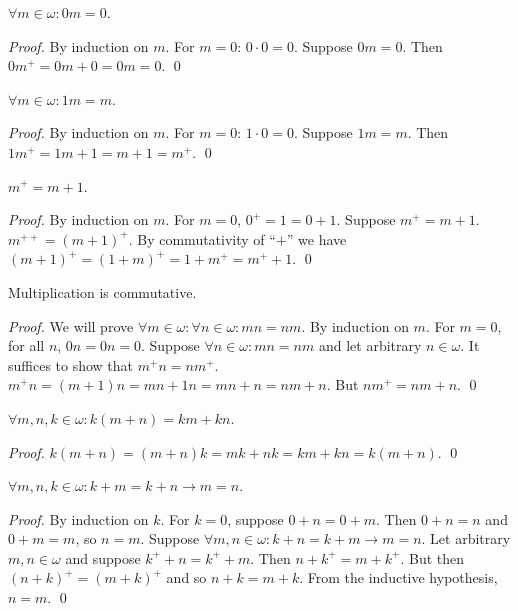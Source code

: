 \documentclass[11pt]{llncs}
\begin{document}
\begin{lemma}
  $\forall m \in \omega: 0m = 0$.
\end{lemma}
\begin{proof}
  By induction on $m$. For $m = 0$: $0 \cdot 0 = 0$. Suppose $0m = 0$. Then
  $0m^+ = 0m + 0 = 0m = 0$.
  \qed
\end{proof}

\begin{lemma}
  $\forall m \in \omega: 1m = m$.
\end{lemma}
\begin{proof}
  By induction on $m$. For $m = 0$: $1 \cdot 0 = 0$. Suppose $1m = m$. Then
  $1m^+ = 1m + 1 = m + 1 = m^+$.
  \qed
\end{proof}

\begin{lemma}
  $m^+ = m + 1$.
\end{lemma}
\begin{proof}
  By induction on $m$. For $m = 0$, $0^+ = 1 = 0 + 1$.
  Suppose $m^+ = m + 1$. $m^{++} = (m + 1)^+$. By commutativity of ``$+$'' we
  have $(m + 1)^+ = (1 + m)^+ = 1 + m^+ = m^+ + 1$.
  \qed
\end{proof}

\begin{lemma}
  Multiplication is commutative.
\end{lemma}
\begin{proof}
  We will prove $\forall m \in \omega: \forall n \in \omega: mn = nm$.
  By induction on $m$. For $m = 0$, for all $n$, $0n = 0n = 0$.
  Suppose $\forall n \in \omega: mn = nm$ and let arbitrary $n \in \omega$.
  It suffices to show that $m^+n = nm^+$.
  $m^+n = (m + 1)n = mn + 1n = mn + n = nm + n$.
  But $nm^+ = nm + n$.
  \qed
\end{proof}

\begin{lemma}
  $\forall m, n, k \in \omega: k(m + n) = km + kn$.
\end{lemma}
\begin{proof}
  $k(m + n) = (m + n)k = mk + nk = km + kn = k(m + n)$.
  \qed
\end{proof}

\begin{lemma}\label{lem:addition-cancels}
  $\forall m, n, k \in \omega: k + m = k + n \rightarrow m = n$.
\end{lemma}
\begin{proof}
  By induction on $k$. For $k = 0$, suppose $0 + n = 0 + m$. Then
  $0 + n = n$ and $0 + m = m$, so $n = m$.
  Suppose $\forall m, n \in \omega: k + n = k + m \rightarrow m = n$.
  Let arbitrary $m, n \in \omega$ and suppose $k^+ + n = k^+ + m$.
  Then $n + k^+ = m + k^+$. But then $(n + k)^+ = (m + k)^+$ and so $n + k = m + k$.
  From the inductive hypothesis, $n = m$.
  \qed
\end{proof}
\end{document}
